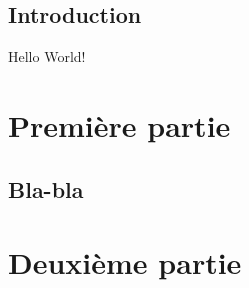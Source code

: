 \documentclass[11pt,twoside,openright]{report}
\begin{document}
  \begin{abstract}
    \blindtext
  \end{abstract}

  \tableofcontents

  \chapter*{Introduction}

  Hello World!

  \part{Première partie}
  \chapter{Bla-bla}

  \blindmathtrue
  \blindtext

  \part{Deuxième partie}
  \blinddocument
\end{document}
